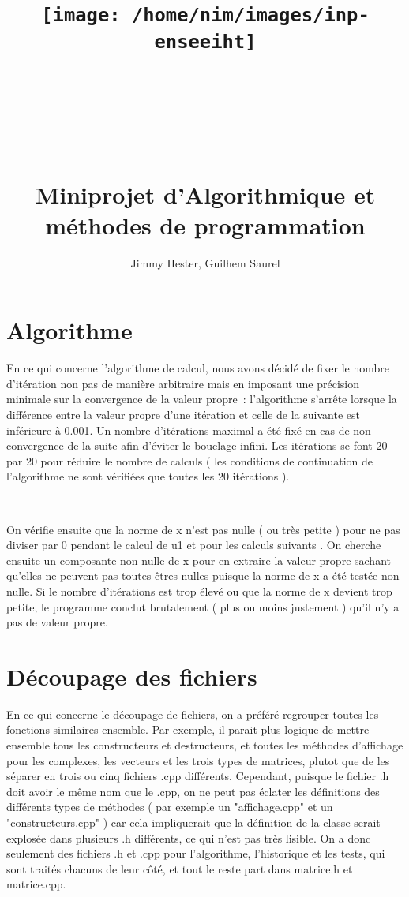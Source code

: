 \documentclass[a4paper]{article}
\title{\texttt{[image: /home/nim/images/inp-enseeiht]} \\ ~ \\ ~ \\ ~ \\ ~ \\ Miniprojet d'Algorithmique et méthodes de programmation}
\author{Jimmy Hester, Guilhem Saurel}
\date{\oldstylenums{\today}}
\begin{document}
\begin{titlepage}
 \maketitle
\end{titlepage}

\tableofcontents
\newpage

\section{Algorithme}

En ce qui concerne l'algorithme de calcul, nous avons décidé de fixer le nombre d'itération non pas de manière arbitraire mais en imposant une précision minimale sur la convergence de la valeur propre : l'algorithme s’arrête lorsque la différence entre la valeur propre d'une itération et celle de la suivante est inférieure à 0.001. Un nombre d'itérations maximal a été fixé en cas de non convergence de la suite afin d'éviter le bouclage infini. Les itérations se font 20 par 20 pour réduire le nombre de calculs ( les conditions de continuation de l'algorithme ne sont vérifiées que toutes les 20 itérations ).

~

On vérifie ensuite que la norme de x n'est pas nulle ( ou très petite ) pour ne pas diviser par 0 pendant le calcul de u1 et pour les calculs suivants . On cherche ensuite un composante non nulle de x pour en extraire la valeur propre sachant qu'elles ne peuvent pas toutes êtres nulles puisque la norme de x a été testée non nulle. Si le nombre d'itérations est trop élevé ou que la norme de x devient trop petite, le programme conclut brutalement ( plus ou moins justement ) qu'il n'y a pas de valeur propre.

\section{Découpage des fichiers}

En ce qui concerne le découpage de fichiers, on a préféré regrouper toutes les fonctions similaires ensemble. Par exemple, il parait plus logique de mettre ensemble tous les constructeurs et destructeurs, et toutes les méthodes d'affichage pour les complexes, les vecteurs et les trois types de matrices, plutot que de les séparer en trois ou cinq fichiers .cpp différents. Cependant, puisque le fichier .h doit avoir le même nom que le .cpp, on ne peut pas éclater les définitions des différents types de méthodes ( par exemple un "affichage.cpp" et un "constructeurs.cpp" ) car cela impliquerait que la définition de la classe serait explosée dans plusieurs .h différents, ce qui n'est pas très lisible. On a donc seulement des fichiers .h et .cpp pour l'algorithme, l'historique et les tests, qui sont traités chacuns de leur côté, et tout le reste part dans matrice.h et matrice.cpp.
\end{document}
